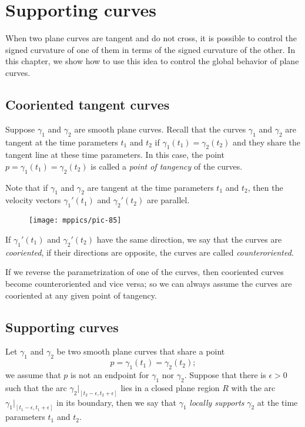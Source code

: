 \chapter{Supporting curves}
\label{chap:supporting-curves}

When two plane curves are tangent and do not cross, it is possible to control the signed curvature of one of them in terms of the signed curvature of the other.
In this chapter, we show how to use this idea to control the global behavior of plane curves.

\section{Cooriented tangent curves}

Suppose $\gamma_1$ and $\gamma_2$ are smooth plane curves.
Recall that the curves $\gamma_1$ and $\gamma_2$ are tangent at the  time parameters $t_1$ and $t_2$
if $\gamma_1(t_1)=\gamma_2(t_2)$
and they share the tangent line at these time parameters.
In this case, the point $p=\gamma_1(t_1)=\gamma_2(t_2)$ is called a \emph{point of tangency} of the curves.

Note that if $\gamma_1$ and $\gamma_2$ are tangent at the time parameters $t_1$ and $t_2$, 
then the velocity vectors $\gamma_1'(t_1)$ and $\gamma_2'(t_2)$ are parallel.
\begin{figure}[!ht]
\vskip-0mm
\centering
\texttt{[image: mppics/pic-85]}
\vskip-0mm
\end{figure}
If $\gamma_1'(t_1)$ and $\gamma_2'(t_2)$ have the same direction, we say that the curves are \emph{cooriented},
if their directions are opposite, the curves are called \emph{counteroriented}.

If we reverse the parametrization of one of the curves, then cooriented curves become counteroriented and vice versa; so we can always assume the curves are cooriented at any given point of tangency.

\section{Supporting curves}

Let $\gamma_1$ and $\gamma_2$ be two smooth plane curves that share a point 
\[p=\gamma_1(t_1)=\gamma_2(t_2);\] 
we assume that $p$ is not an endpoint for $\gamma_1$ nor $\gamma_2$.
Suppose that there is $\epsilon>0$ such that the arc $\gamma_2|_{[t_2-\epsilon, t_2+\epsilon]}$ lies in a closed plane region $R$ with the arc $\gamma_1|_{[t_1-\epsilon, t_1+\epsilon]}$ in its boundary,
then we say that $\gamma_1$ \emph{locally supports} $\gamma_2$ at the time parameters $t_1$ and $t_2$.


